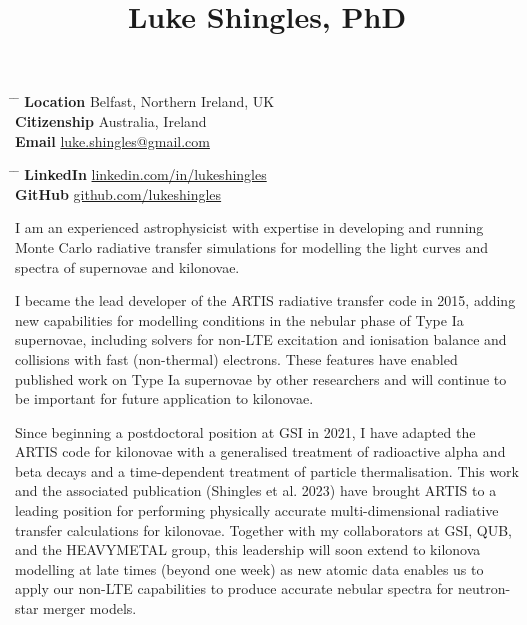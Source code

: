\documentclass[11pt]{article} %
\begin{document}
\title{Luke Shingles, PhD} %

\parbox{0.5\textwidth}{ %
\begin{tabbing} %
\hspace{2.3cm} \= \hspace{4cm} \= \kill %
{\bf Location} \> Belfast, Northern Ireland, UK\\
{\bf Citizenship} \> Australia, Ireland\\
{\bf Email} \> \href{mailto:luke.shingles@gmail.com}{luke.shingles@gmail.com}
\end{tabbing}}
\hfill %
\parbox{0.5\textwidth}{ %
\begin{tabbing} %
\hspace{2.3cm} \= \hspace{4cm} \= \kill %
{\bf LinkedIn} \> \href{https://www.linkedin.com/in/lukeshingles}{linkedin.com/in/lukeshingles}\\
{\bf GitHub} \> \href{https://github.com/lukeshingles}{github.com/lukeshingles}\\
\end{tabbing}}

I am an experienced astrophysicist with expertise in developing and running Monte Carlo radiative transfer simulations for modelling the light curves and spectra of supernovae and kilonovae.

I became the lead developer of the ARTIS radiative transfer code in 2015, adding new capabilities for modelling conditions in the nebular phase of Type Ia supernovae, including solvers for non-LTE excitation and ionisation balance and collisions with fast (non-thermal) electrons. These features have enabled published work on Type Ia supernovae by other researchers and will continue to be important for future application to kilonovae.

Since beginning a postdoctoral position at GSI in 2021, I have adapted the ARTIS code for kilonovae with a generalised treatment of radioactive alpha and beta decays and a time-dependent treatment of particle thermalisation. This work and the associated publication (Shingles et al. 2023) have brought ARTIS to a leading position for performing physically accurate multi-dimensional radiative transfer calculations for kilonovae. Together with my collaborators at GSI, QUB, and the HEAVYMETAL group, this leadership will soon extend to kilonova modelling at late times (beyond one week) as new atomic data enables us to apply our non-LTE capabilities to produce accurate nebular spectra for neutron-star merger models.
\end{document}
